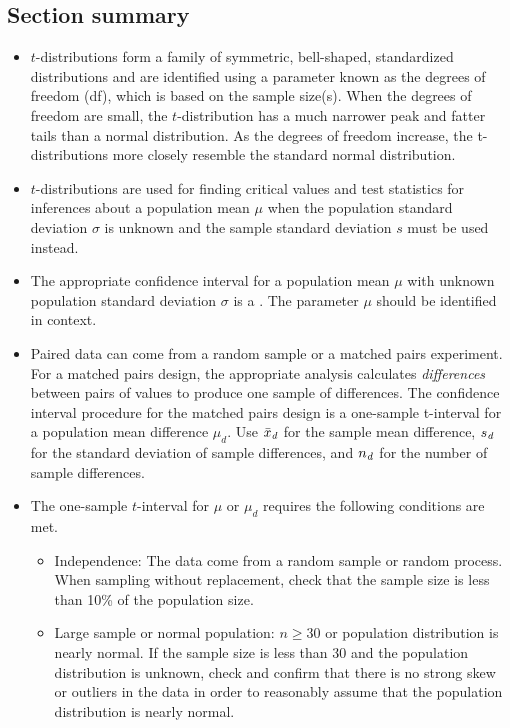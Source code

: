 \subsection*{Section summary}
\begin{itemize} 

\item $t$-distributions form a family of symmetric,
bell-shaped, standardized distributions and are identified using a parameter known as the degrees of freedom (df), which is based on
the sample size(s). When the degrees of freedom are small, the $t$-distribution
has a much narrower peak and fatter tails than a normal distribution.  As the
degrees of freedom increase, the t-distributions more closely resemble the
standard normal distribution.
\item $t$-distributions are used for finding critical values and test statistics for
inferences about a population mean $\mu$ when the population standard
deviation $\sigma$ is unknown and the sample standard deviation $s$ must be used instead.

\item The appropriate confidence interval for a population mean $\mu$ with unknown population standard deviation $\sigma$ is a .  The parameter $\mu$ should be identified in context.

\item Paired data can come from a random sample or a matched pairs experiment.  For a matched pairs design, the appropriate analysis calculates \emph{differences} between pairs of values to produce one sample
of differences. The confidence interval procedure for the matched pairs design is a one-sample t-interval for a population mean difference $\mu_d$.  Use $\bar{x}_{\text{\emph{d}}}$ for the sample mean difference, $s_{\text{\emph{d}}}$ for the standard deviation of sample differences, and $n_{\text{\emph{d}}}$ for the number of sample differences.  

\item The one-sample $t$-interval for $\mu$ or $\mu_d$ requires the following conditions are met.
\begin{itemize}
\item[1.] Independence:  The data come from a random sample or random process.  When sampling without replacement, check that the sample size is less than 10\% of the population size.
\item[2.] Large sample or normal population: $n\ge 30$ or population distribution is nearly normal. If the sample size is less than 30 and the population distribution is unknown, check and confirm that there is no strong skew or outliers in the data in order to reasonably assume that the population distribution is nearly normal.
\end{itemize}


\end{itemize}
